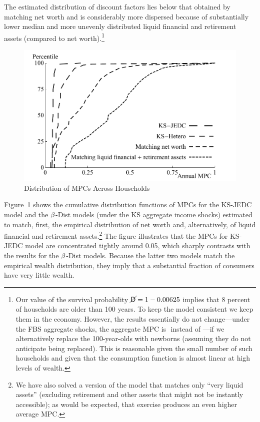 \documentclass[12pt,titlepage]{econtex}
\begin{document}
The estimated distribution of discount factors lies below that obtained by matching net worth and is considerably more dispersed because of substantially lower median and more unevenly distributed liquid financial and retirement assets (compared to net worth).\footnote{Our value of the survival probability $\cancel{\mathsf{D}}=1 -0.00625$ implies that 8 percent of households are older than 100 years. To keep the model consistent we keep them in the economy.  However, the results essentially do not change---under the FBS aggregate shocks, the aggregate MPC is
  $
   $
  instead of
  $
   $---if we alternatively replace the 100-year-olds with newborns (assuming they do not anticipate being replaced). This is reasonable given the small number of such households and given that the consumption function is almost linear at high levels of wealth.
}

\begin{figure}
  \begin{center}
    \caption{Distribution of MPCs Across Households}
    \label{MPCdist}
    \includegraphics[scale=1.25]{./Figures/DistributionsMPCsDistSevenAndKSKSAggShocksPlot}
  \end{center}
\end{figure}

Figure~\ref{MPCdist} shows the cumulative distribution functions of
MPCs for the KS-JEDC model and the $\beta$-Dist models (under the KS aggregate income shocks) estimated to match, first, the empirical distribution of net worth and, alternatively, of liquid
financial and retirement assets.\footnote{We have also solved a version of the model
  that matches only ``very liquid assets'' (excluding retirement and other assets that might not be instantly accessible); as would be expected, that exercise produces an even higher average MPC.}  The figure illustrates that the MPCs for KS-JEDC model are concentrated tightly around 0.05, which sharply
contrasts with the results for the $\beta$-Dist models. Because
the latter two models match the empirical wealth distribution, they
imply that a substantial fraction of consumers have very little
wealth.
\end{document}
